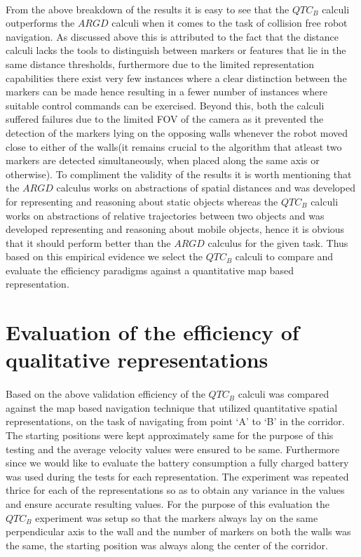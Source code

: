 \paragraph{} From the above breakdown of the results it is easy to see that the $QTC_B$ calculi outperforms the $ARGD$ calculi when it comes to the task of collision free robot navigation. As discussed above this is attributed to the fact that the distance calculi lacks the tools to distinguish between markers or features that lie in the same distance thresholds, furthermore due to the limited representation capabilities there exist very few instances where a clear distinction between the markers can be made hence resulting in a fewer number of instances where suitable control commands can be exercised. Beyond this, both the calculi suffered failures due to the limited FOV of the camera as it prevented the detection of the markers lying on the opposing walls whenever the robot moved close to either of the walls(it remains crucial to the algorithm that atleast two markers are detected simultaneously, when placed along the same axis or otherwise). To compliment the validity of the results it is worth mentioning that the $ARGD$ calculus works on abstractions of spatial distances and was developed for representing and reasoning about static objects whereas the $QTC_B$ calculi works on abstractions of relative trajectories between two objects and was developed representing and reasoning about mobile objects, hence it is obvious that it should perform better than the $ARGD$ calculus for the given task. Thus based on this empirical evidence we select the $QTC_B$ calculi to compare and evaluate the efficiency paradigms against a quantitative map based representation.


\section{Evaluation of the efficiency of qualitative representations}
\paragraph{}Based on the above validation efficiency of the $QTC_B$ calculi was compared against the map based navigation technique that utilized quantitative spatial representations, on the task of navigating from point `A' to `B' in the corridor. The starting positions were kept approximately same for the purpose of this testing and the average velocity values were ensured to be same. Furthermore since we would like to evaluate the battery consumption a fully charged battery was used during the tests for each representation. The experiment was repeated thrice for each of the representations so as to obtain any variance in the values and ensure accurate resulting values. For the purpose of this evaluation the $QTC_B$ experiment was setup so that the markers always lay on the same perpendicular axis to the wall and the number of markers on both the walls was the same, the starting position was always along the center of the corridor.

